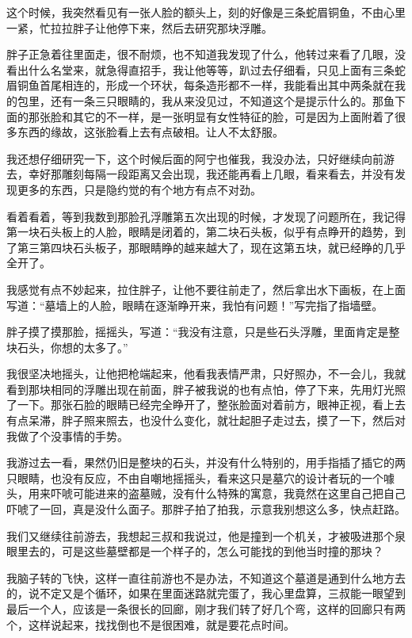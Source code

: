 这个时候，我突然看见有一张人脸的额头上，刻的好像是三条蛇眉铜鱼，不由心里一紧，忙拉拉胖子让他停下来，然后去研究那块浮雕。

胖子正急着往里面走，很不耐烦，也不知道我发现了什么，他转过来看了几眼，没看出什么名堂来，就急得直招手，我让他等等，趴过去仔细看，只见上面有三条蛇眉铜鱼首尾相连的，形成一个环状，每条造形都不一样，我能看出其中两条就在我的包里，还有一条三只眼睛的，我从来没见过，不知道这个是提示什么的。那鱼下面的那张脸和其它的不一样，是一张明显有女性特征的脸，可是因为上面附着了很多东西的缘故，这张脸看上去有点破相。让人不太舒服。

我还想仔细研究一下，这个时候后面的阿宁也催我，我没办法，只好继续向前游去，幸好那雕刻每隔一段距离又会出现，我还能再看上几眼，看来看去，并没有发现更多的东西，只是隐约觉的有个地方有点不对劲。

看着看着，等到我数到那脸孔浮雕第五次出现的时候，才发现了问题所在，我记得第一块石头板上的人脸，眼睛是闭着的，第二块石头板，似乎有点睁开的趋势，到了第三第四块石头板子，那眼睛睁的越来越大了，现在这第五块，就已经睁的几乎全开了。

我感觉有点不妙起来，拉住胖子，让他不要往前走了，然后拿出水下画板，在上面写道：“墓墙上的人脸，眼睛在逐渐睁开来，我怕有问题！”写完指了指墙壁。

胖子摸了摸那脸，摇摇头，写道：“我没有注意，只是些石头浮雕，里面肯定是整块石头，你想的太多了。”

我很坚决地摇头，让他把枪端起来，他看我表情严肃，只好照办，不一会儿，我就看到那块相同的浮雕出现在前面，胖子被我说的也有点怕，停了下来，先用灯光照了一下。那张石脸的眼睛已经完全睁开了，整张脸面对着前方，眼神正视，看上去有点呆滞，胖子照来照去，也没什么变化，就壮起胆子走过去，摸了一下，然后对我做了个没事情的手势。

我游过去一看，果然仍旧是整块的石头，并没有什么特别的，用手指插了插它的两只眼睛，也没有反应，不由自嘲地摇摇头，看来这只是墓穴的设计者玩的一个噱头，用来吓唬可能进来的盗墓贼，没有什么特殊的寓意，我竟然在这里自己把自己吓唬了一回，真是没什么面子。那胖子拍了拍我，示意我别想这么多，快点赶路。

我们又继续往前游去，我想起三叔和我说过，他是撞到一个机关，才被吸进那个泉眼里去的，可是这些墓壁都是一个样子的，怎么可能找的到他当时撞的那块？

我脑子转的飞快，这样一直往前游也不是办法，不知道这个墓道是通到什么地方去的，说不定又是个循环，如果在里面迷路就完蛋了，我心里盘算，三叔能一眼望到最后一个人，应该是一条很长的回廊，刚才我们转了好几个弯，这样的回廊只有两个，这样说起来，找找倒也不是很困难，就是要花点时间。

